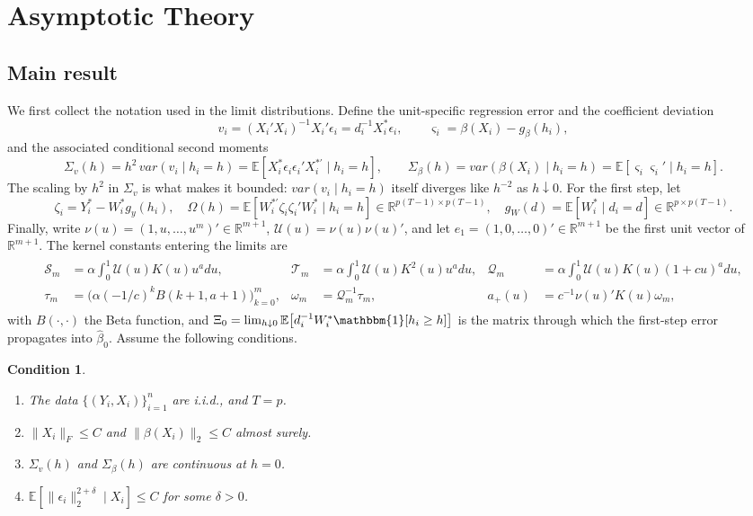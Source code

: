 \documentclass{article}
\newtheorem{condition}{Condition}
\newcommand{\normm}[1]{\lVert#1\rVert}
\newcommand{\E}{\mathbb{E}}
\newcommand{\R}{\mathbb{R}}
\newcommand{\I}{\mathbbm{1}}
\begin{document}
\section{Asymptotic Theory}\label{sec:theory}
\subsection{Main result}

We first collect the notation used in the limit distributions. Define the unit-specific
regression error and the coefficient deviation
\[
    v_i=(X_i'X_i)^{-1}X_i'\epsilon_i=d_i^{-1}X_i^{*}\epsilon_i,
    \qquad
    \varsigma_i = \beta(X_i)-g_{\beta}(h_i),
\]
and the associated conditional second moments
\[
    \Sigma_v(h) = h^2\,var(v_i\mid h_i=h)=\E\!\left[X_i^{*}\epsilon_i\epsilon_i'X_i^{*\prime}\mid h_i=h\right],
    \qquad
    \Sigma_\beta(h) = var\!\left(\beta(X_i)\mid h_i=h\right)=\E[\varsigma_i\varsigma_i'\mid h_i=h].
\]
The scaling by $h^2$ in $\Sigma_v$ is what makes it bounded: $var(v_i\mid h_i=h)$ itself diverges
like $h^{-2}$ as $h\downarrow0$. For the first step, let
\[
    \zeta_i = Y_i^{*}-W_i^{*}g_y(h_i),\quad\Omega(h)=\E[W_i^{*\prime}\zeta_i\zeta_i'W_i^{*}\mid h_i=h]\in\R^{p(T-1)\times p(T-1)},
    \quad
    g_W(d) = \E[W_i^{*}\mid d_i=d]\in\R^{p\times p(T-1)}.
\]
Finally, write $\nu(u)=(1,u,\dots,u^m)'\in\R^{m+1}$, $\mathcal{U}(u)=\nu(u)\nu(u)'$, and let $e_1=(1,0,\dots,0)'\in\R^{m+1}$ be
the first unit vector of $\R^{m+1}$. The kernel constants entering the limits are
\begin{align}\label{eq:kernel_constants}
\begin{aligned}
    \mathcal{S}_m &= \alpha\int_{0}^{1}\mathcal{U}(u)K(u)u^{a}du,
    &\mathcal{T}_m &= \alpha\int_{0}^{1}\mathcal{U}(u)K^{2}(u)u^{a}du,
    &\mathcal{Q}_m &= \alpha\int_{0}^{1}\mathcal{U}(u)K(u)(1+cu)^{a}du,\\
    \tau_m &= \Big(\alpha(-1/c)^{k}B(k+1,a+1)\Big)_{k=0}^{m},
    &\omega_m &= \mathcal{Q}_m^{-1}\tau_m,
    &a_{+}(u) &= c^{-1}\nu(u)'K(u)\omega_m,
\end{aligned}
\end{align}
with $B(\cdot,\cdot)$ the Beta function, and
$\Xi_0 = \lim_{h\downarrow0}\E\!\left[d_i^{-1}W_i^{*}\I[h_i\ge h]\right]$ is the matrix through
which the first-step error propagates into $\hat\beta_0$. Assume the following conditions.

\begin{condition}\label{cond:Regularity}\leavevmode
    \begin{enumerate}
        \item\label{reg:iid} The data $\{(Y_i,X_i)\}_{i=1}^n$ are i.i.d., and $T=p$.
        \item\label{reg:bounded} $\normm{X_i}_F\leq C$ and $\normm{\beta(X_i)}_2\leq C$ almost surely.
              
        \item\label{reg:continuity} $\Sigma_v(h)$ and $\Sigma_\beta(h)$ are continuous at $h=0$.
        \item\label{reg:moment} $\E[\|\epsilon_i\|_2^{2+\delta}\mid X_i]\leq C$ for some $\delta>0$.
    \end{enumerate}
\end{condition}
\end{document}
